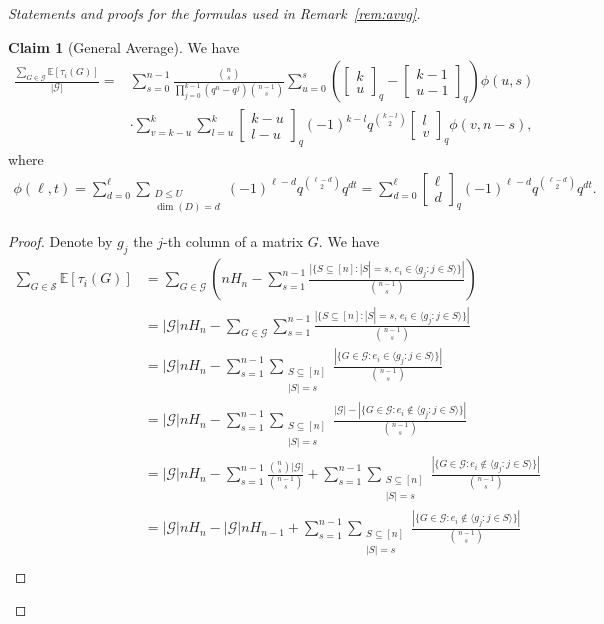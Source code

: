 \documentclass[11pt,a4paper,reqno,twoside]{amsart}
\theoremstyle{definition}
\newcommand{\E}{\mathbb{E}}
\newcommand{\mS}{\mathcal{S}}
\newcommand{\mG}{\mathcal{G}}
\newcommand\qbin[3]{\left[\begin{matrix} #1 \\ #2 \end{matrix}\right]_{#3}}
\newtheorem{claim}{Claim}
\begin{document}
\begin{appendix}
\begin{proof}[Statements and proofs for the formulas used in Remark~\ref{rem:avvg}]
\begin{claim}[General Average] \label{cl:genav}
    We have
    \begin{align*}
        \frac{\sum_{G \in \mG}\E[{\tau}_i(G)]}{|\mG|} = &\sum_{s=0}^{n-1}\frac{\binom{n}{s}}{\prod_{j=0}^{k-1}(q^n-q^j)\binom{n-1}{s}}\sum_{u=0}^s \left(\qbin{k}{u}{q}-\qbin{k-1}{u-1}{q}\right)\phi(u,s) \\
        &\cdot \sum_{v=k-u}^k\sum_{l=u}^k\qbin{k-u}{l-u}{q}(-1)^{k-l}q^{\binom{k-l}{2}} \qbin{l}{v}{q}\phi(v,n-s),
    \end{align*}
    where 
    \begin{align*}
    \phi(\ell,t)= \sum_{d=0}^{\ell}\sum_{\substack{D \le U \\ \dim(D)=d}}(-1)^{{\ell}-d}q^{\binom{{\ell}-d}{2}}q^{dt} = \sum_{d=0}^{\ell}\qbin{{\ell}}{d}{q}(-1)^{{\ell}-d}q^{\binom{{\ell}-d}{2}}q^{dt}.
\end{align*}
\end{claim}
\begin{proof}
Denote by $g_j$ the $j$-th column of a matrix $G$.
We have
\begin{align*}
   \sum_{G \in \mS}\E[{\tau}_i(G)] &= \sum_{G \in \mG}\left(nH_n-\sum_{s=1}^{n-1}\frac{|\{S \subseteq [n] : |S|=s, \, e_i \in \langle g_j :j \in S \rangle\}|}{\binom{n-1}{s}}\right) \\
    &= |\mG| nH_n- \sum_{G \in \mG}\sum_{s=1}^{n-1}\frac{|\{S \subseteq [n] : |S|=s, \, e_i \in \langle g_j :j \in S \rangle\}|}{\binom{n-1}{s}}\\
    &= |\mG| nH_n- \sum_{s=1}^{n-1}\sum_{\substack{S \subseteq [n]\\ |S| = s}}\frac{|\{G \in \mG : e_i \in \langle g_j :j \in S \rangle\}|}{\binom{n-1}{s}}\\
    &= |\mG| nH_n- \sum_{s=1}^{n-1}\sum_{\substack{S \subseteq [n]\\ |S| = s}}\frac{|\mG|-|\{G \in \mG : e_i \notin \langle g_j :j \in S \rangle\}|}{\binom{n-1}{s}} \\
    &= |\mG| nH_n- \sum_{s=1}^{n-1}\frac{\binom{n}{s}|\mG|}{\binom{n-1}{s}}+\sum_{s=1}^{n-1}\sum_{\substack{S \subseteq [n]\\ |S| = s}}\frac{|\{G \in \mG : e_i \notin \langle g_j :j \in S \rangle\}|}{\binom{n-1}{s}}  \\
    &= |\mG| nH_n- |\mG| nH_{n-1}+\sum_{s=1}^{n-1}\sum_{\substack{S \subseteq [n]\\ |S| = s}}\frac{|\{G \in \mG : e_i \notin \langle g_j :j \in S \rangle\}|}{\binom{n-1}{s}} \\

\end{align*}
\end{proof}
\end{proof}
\end{appendix}
\end{document}
